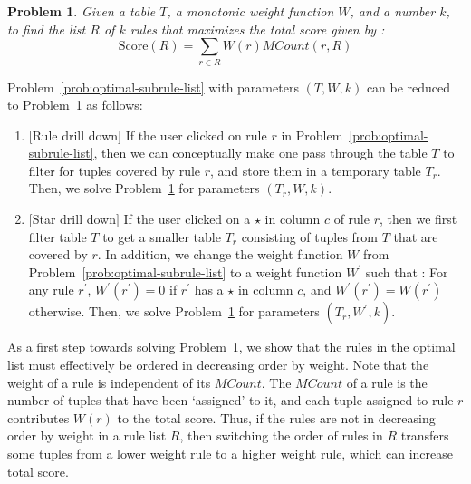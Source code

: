 \documentclass[10pt,journal,compsoc]{IEEEtran}
\newcounter{prob}
\newtheorem{problem}[prob]{Problem}
\begin{document}
\begin{problem}\label{prob:optimal-rule-list}
Given a table $T$, a monotonic weight function $W$, and a number $k$, to find the list $R$ of $k$ rules that maximizes the total score given by :
$$\text{Score}(R) = \sum_{r \in R}W(r)MCount(r,R)$$
\end{problem}

\noindent Problem~\ref{prob:optimal-subrule-list} with parameters $(T, W, k)$ can be reduced to Problem~\ref{prob:optimal-rule-list} as follows:
\begin{enumerate}
\item $[$Rule drill down$]$ If the user clicked on rule $r$ in Problem~\ref{prob:optimal-subrule-list}, then we can conceptually make one pass through the table $T$ to filter for tuples covered by rule $r$, and store them in a temporary table $T_r$. Then, we solve Problem~\ref{prob:optimal-rule-list} for parameters $(T_r, W, k)$.
\item $[$Star drill down$]$ If the user clicked on a $\star$ in column $c$ of rule $r$, then we first filter table $T$ to get a smaller table $T_r$ consisting of tuples from $T$ that are covered by $r$. In addition, we change the weight function $W$ from Problem~\ref{prob:optimal-subrule-list} to a weight function $W^{\prime}$ such that : For any rule $r^{\prime}$, $W^{\prime}(r^{\prime}) = 0$ if $r^{\prime}$ has a $\star$ in column $c$, and $W^{\prime}(r^{\prime}) = W(r^{\prime})$ otherwise. Then, we solve Problem~\ref{prob:optimal-rule-list} for parameters $(T_r, W^{\prime}, k)$.
\end{enumerate}

As a first step towards solving Problem~\ref{prob:optimal-rule-list}, we show that the rules in the optimal list must effectively be ordered in decreasing order by weight. Note that the weight of a rule is independent of its $MCount$. The $MCount$ of a rule is the number of tuples that have been `assigned' to it, and each tuple assigned to rule $r$ contributes $W(r)$ to the total score. Thus, if the rules are not in decreasing order by weight in a rule list $R$, then switching the order of rules in $R$ transfers some tuples from a lower weight rule to a higher weight rule, which can increase total score.
\end{document}
